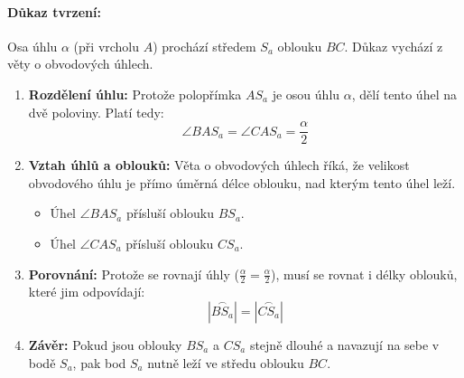 \documentclass{MO}
\begin{document}
\newpage
\paragraph{Důkaz tvrzení:}
Osa úhlu $\alpha$ (při vrcholu $A$) prochází středem $S_a$ oblouku $BC$. Důkaz vychází z věty o obvodových úhlech.

\begin{enumerate}
    \item \textbf{Rozdělení úhlu:}
    Protože polopřímka $A S_a$ je osou úhlu $\alpha$, dělí tento úhel na dvě poloviny. Platí tedy:
    \[
        \angle BAS_a = \angle CAS_a = \frac{\alpha}{2}
    \]

    \item \textbf{Vztah úhlů a oblouků:}
    Věta o obvodových úhlech říká, že velikost obvodového úhlu je přímo úměrná délce oblouku, nad kterým tento úhel leží.
    \begin{itemize}
        \item Úhel $\angle BAS_a$ přísluší oblouku $B S_a$.
        \item Úhel $\angle CAS_a$ přísluší oblouku $C S_a$.
    \end{itemize}

    \item \textbf{Porovnání:}
    Protože se rovnají úhly ($\frac{\alpha}{2} = \frac{\alpha}{2}$), musí se rovnat i délky oblouků, které jim odpovídají:
    \[
        \left| \overset{\frown}{BS_a} \right| = \left| \overset{\frown}{CS_a} \right|
    \]

    \item \textbf{Závěr:}
    Pokud jsou oblouky $B S_a$ a $C S_a$ stejně dlouhé a navazují na sebe v bodě $S_a$, pak bod $S_a$ nutně leží ve středu oblouku $BC$.
\end{enumerate}

\vspace{2cm}
\end{document}
